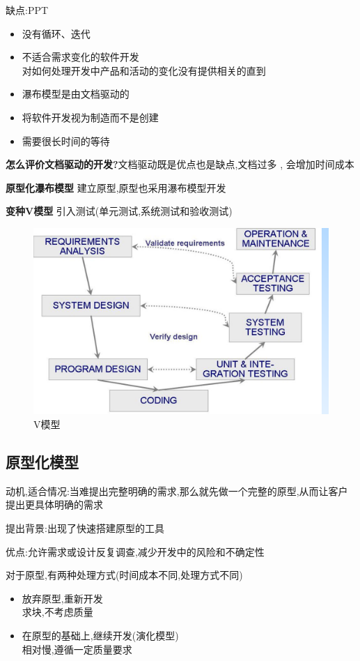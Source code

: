 \documentclass[UTF8,a4paper]{ctexart}
\begin{document}
缺点:PPT
\begin{itemize}
  \item 没有循环、迭代
  \item 不适合需求变化的软件开发\\
  对如何处理开发中产品和活动的变化没有提供相关的直到
  \item 瀑布模型是由文档驱动的
  \item 将软件开发视为制造而不是创建
  \item 需要很长时间的等待
\end{itemize}

\textbf{怎么评价文档驱动的开发?}文档驱动既是优点也是缺点,文档过多 , 会增加时间成本

\textbf{原型化瀑布模型}
建立原型,原型也采用瀑布模型开发

\textbf{变种V模型}
引入测试(单元测试,系统测试和验收测试)
\begin{figure}[H]
  \centering
  \includegraphics[scale = 0.3]{assets/SoftwareEngineering_50540.png}
  \caption{V模型}
\end{figure}


\subsection{原型化模型}
动机,适合情况:当难提出完整明确的需求,那么就先做一个完整的原型,从而让客户提出更具体明确的需求

提出背景:出现了快速搭建原型的工具

优点:允许需求或设计反复调查,减少开发中的风险和不确定性

对于原型,有两种处理方式(时间成本不同,处理方式不同)
\begin{itemize}
  \item 放弃原型,重新开发\\
  求块,不考虑质量
  \item 在原型的基础上,继续开发(演化模型)\\
  相对慢,遵循一定质量要求
\end{itemize}
\end{document}
